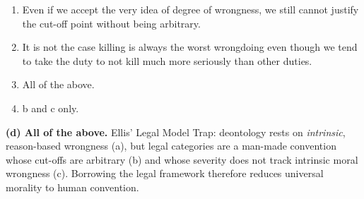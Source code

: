 \documentclass[12pt]{article}
\begin{document}
\begin{enumerate}
\begin{enumerate}
        \item Even if we accept the very idea of degree of wrongness, we still cannot justify the cut-off point without being arbitrary.
        \item It is not the case killing is always the worst wrongdoing even though we tend to take the duty to not kill much more seriously than other duties.
        \item All of the above.
        \item b and c only.
    \end{enumerate}
    \begin{answer}\textbf{(d) All of the above.} Ellis’ Legal Model Trap: deontology rests on \emph{intrinsic}, reason-based wrongness (a), but legal categories are a man-made convention whose cut-offs are arbitrary (b) and whose severity does not track intrinsic moral wrongness (c). Borrowing the legal framework therefore reduces universal morality to human convention.\end{answer}
\end{enumerate}
\end{document}
